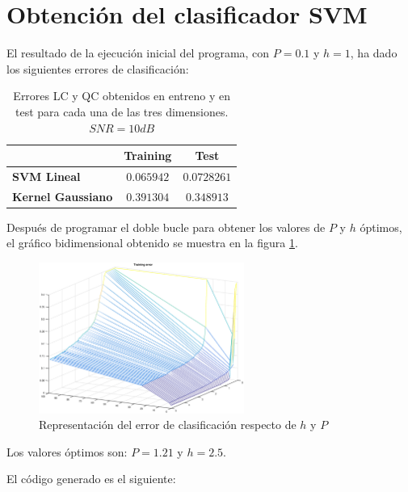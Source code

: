 \documentclass[11pt]{article} %
\begin{document}
\section{Obtención del clasificador SVM}

El resultado de la ejecución inicial del programa, con $P=0.1$ y $h=1$, ha dado los siguientes errores de clasificación:

\begin{table}[h]
	\begin{center}
		\begin{tabular}{| l | c | c |}
			\hline
			\diagbox[width=11em]{\textbf{Clasificador}}{\textbf{Fase}} & \textbf{Training} & \textbf{Test}\\
			\hline
			\textbf{SVM Lineal}     & $ 0.065942 $ & $ 0.0728261 $ \\
			\hline
			\textbf{Kernel Gaussiano} & $ 0.391304 $ & $ 0.348913 $ \\
			\hline
		\end{tabular}
		\caption{Errores LC y QC obtenidos en entreno y en test para cada una de las tres dimensiones. $SNR=10dB$}
		\label{tab:select:LC_QC}
	\end{center}
\end{table}

Después de programar el doble bucle para obtener los valores de $P$ y $h$ óptimos, el gráfico bidimensional obtenido se muestra en la figura \ref{fig:svm:p_h_optimo}.

\begin{figure}[h]
	\centering
	\includegraphics[width=0.6\textwidth]{../s1_svm/3_train_error.eps}
	\caption[]{\small Representación del error de clasificación respecto de $h$ y $P$}
	\label{fig:svm:p_h_optimo}
\end{figure}

Los valores óptimos son: $P=1.21$ y $h=2.5$.

El código generado es el siguiente:
\end{document}

